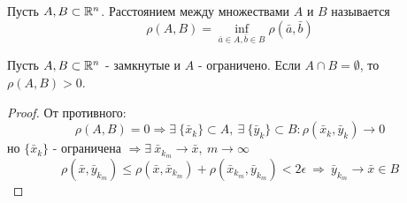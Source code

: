 \begin{definition}
    Пусть $A,B\subset \mathbb{R}^n$. Расстоянием между множествами $A$ и $B$ называется 
    \[\rho(A,B)=\inf\limits_{\bar{a}\in A,\bar{b}\in B}\rho(\bar{a}, \bar{b})\]
\end{definition} 
\begin{theorem}
    Пусть $A,B \subset \mathbb{R}^n$ - замкнутые и $A$ - ограничено. Если $A\cap B=\emptyset$, то $\rho(A,B)>0$. 
\end{theorem} 
\begin{proof}
    От противного:
    \[\rho(A,B)=0 \Rightarrow \exists\ \{\bar{x}_k\}\subset A,\ \exists\ \{\bar{y}_k\}\subset B: \rho(\bar{x}_k, \bar{y}_k)\to 0\] 
    но $\{\bar{x}_k\}$ - ограничена $\Rightarrow \exists\ \bar{x}_{k_m}\to \bar{x},\ m\to \infty$
    \[\rho(\bar{x}, \bar{y}_{k_m})\leq \rho(\bar{x}, \bar{x}_{k_m})+\rho(\bar{x}_{k_m}, \bar{y}_{k_m})<2\epsilon\ \Rightarrow\ \bar{y}_{k_m}\to \bar{x}\in B\]
\end{proof}

